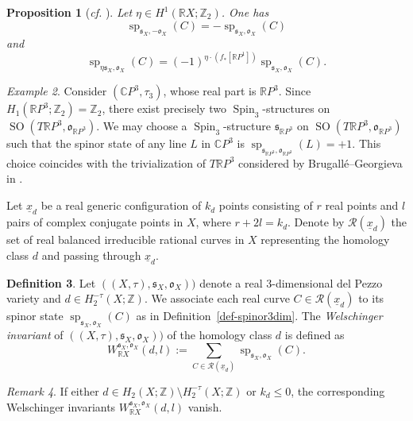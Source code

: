 \documentclass[11pt]{amsart}
\numberwithin{equation}{section}
\theoremstyle{definition}
\newtheorem{definition}{Definition}[section]
\theoremstyle{plain}
\newtheorem{proposition}[definition]{Proposition}
\theoremstyle{remark}
\newtheorem{remark}[definition]{Remark}
\newtheorem{example}[definition]{Example}
\newcommand{\R}{\mathbb{R}}
\newcommand{\Z}{\mathbb{Z}}
\newcommand{\cpp}{\mathbb{C}P^3}
\DeclareMathOperator{\SO}{SO}
\DeclareMathOperator{\Spin}{Spin}
\renewcommand{\sp}{\operatorname{sp}}
\begin{document}
\begin{proposition}[\textit{cf.} {\cite[Lemma 1.7]{welschinger2005stongly}}]\label{Prop-SpinorStates1}
Let $\eta\in H^1(\R X;\Z_2)$. One has
 $$\sp_{\mathfrak{s}_X,\mathfrak{-o}_X}(C)=-\sp_{\mathfrak{s}_X,\mathfrak{o}_X}(C)$$
 and
 $$\sp_{\eta\mathfrak{s}_X,\mathfrak{o}_X}(C)=(-1)^{\eta\cdot (f_*[\R P^1])}\sp_{\mathfrak{s}_X,\mathfrak{o}_X}(C).$$
\end{proposition}


  
  \begin{example}
Consider $(\cpp,\tau_3)$, whose real part is $\R P^3$.    Since $H_1(\R P^3;\Z_2)= \Z_2$, there exist precisely two $\Spin_3$-structures on $\SO(T \R P^3,\mathfrak{o}_{\R P^3})$.   We may choose a $\Spin_3$-structure $\mathfrak{s}_{\R P^3}$ on $\SO(T \R P^3,\mathfrak{o}_{\R P^3})$ such that the spinor state of any line $L$ in $\cpp$ is $\sp_{\mathfrak{s}_{\R P^3},\mathfrak{o}_{\R P^3}}(L)=+1$. This choice coincides with the trivialization of  $T \R P^3$ considered by Brugall\'e--Georgieva in \cite{brugalle2016pencils}.
\end{example}  

  


 Let $\underline{x}_d$ be a real generic configuration of $k_d$ points consisting of $r$ real points and $l$ pairs of complex conjugate points in $X$, where $r+2l=k_d$. 
  Denote by $\mathcal{R}(\underline{x}_d)$ the set of real balanced irreducible  rational curves in $X$ representing the homology class $d$ and passing through $\underline{x}_d$.

   \begin{definition} \label{def-W.inv.dim3}
   Let $((X,\tau),\mathfrak{s}_X,\mathfrak{o}_X))$ denote a real $3$-dimensional del Pezzo variety and $d\in H_2^{-\tau}(X;\Z)$. We associate each real curve $C\in \mathcal{R}(\underline{x}_d)$ to its spinor state $\sp_{\mathfrak{s}_X,\mathfrak{o}_X}(C)$ as in Definition~\ref{def-spinor3dim}.   The \emph{Welschinger invariant} of  $((X,\tau),\mathfrak{s}_X,\mathfrak{o}_X))$ of the homology class $d$ is defined as
   $$W_{\R X}^{\mathfrak{s}_X,\mathfrak{o}_X}(d,l):=\sum_{C\in \mathcal{R}(\underline{x}_d)}\sp_{\mathfrak{s}_X,\mathfrak{o}_X}(C).$$
   \end{definition}
   
   \begin{remark}
If either $d\in H_2(X;\Z)\setminus H_2^{-\tau}(X;\Z)$ or $k_d\leq 0$,  the corresponding Welschinger invariants $W_{\R X}^{\mathfrak{s}_X,\mathfrak{o}_X}(d,l)$ vanish.
\end{remark} 
\end{document}
